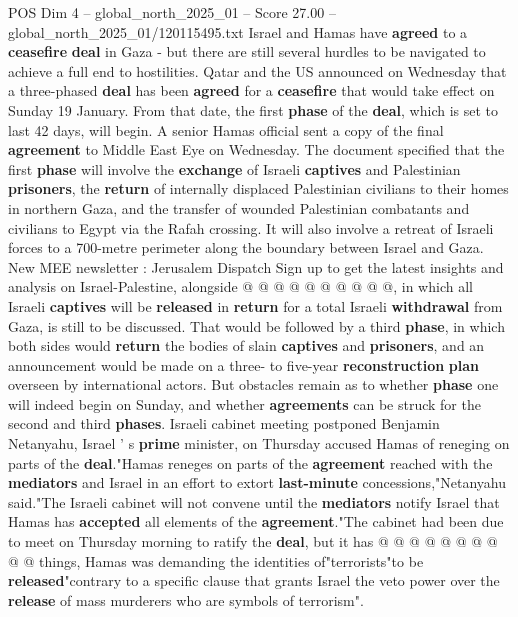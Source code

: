 \begin{textsample}{POS Dim 4 – global\_north\_2025\_01 – Score 27.00 – global\_north\_2025\_01/120115495.txt}  \label{ex:f4_pos_049}
Israel and Hamas have \textbf{agreed} to a \textbf{ceasefire} \textbf{deal} in Gaza - but there are still several hurdles to be navigated to achieve a full end to hostilities.
Qatar and the US announced on Wednesday that a three-phased \textbf{deal} has been \textbf{agreed} for a \textbf{ceasefire} that would take effect on Sunday 19 January.
From that date, the first \textbf{phase} of the \textbf{deal}, which is set to last 42 days, will begin.
A senior Hamas official sent a copy of the final \textbf{agreement} to Middle East Eye on Wednesday.
The document specified that the first \textbf{phase} will involve the \textbf{exchange} of Israeli \textbf{captives} and Palestinian \textbf{prisoners}, the \textbf{return} of internally displaced Palestinian civilians to their homes in northern Gaza, and the transfer of wounded Palestinian combatants and civilians to Egypt via the Rafah crossing.
It will also involve a retreat of Israeli forces to a 700-metre perimeter along the boundary between Israel and Gaza.
New MEE newsletter : Jerusalem Dispatch Sign up to get the latest insights and analysis on Israel-Palestine, alongside @ @ @ @ @ @ @ @ @ @, in which all Israeli \textbf{captives} will be \textbf{released} in \textbf{return} for a total Israeli \textbf{withdrawal} from Gaza, is still to be discussed.
That would be followed by a third \textbf{phase}, in which both sides would \textbf{return} the bodies of slain \textbf{captives} and \textbf{prisoners}, and an announcement would be made on a three- to five-year \textbf{reconstruction} \textbf{plan} overseen by international actors.
But obstacles remain as to whether \textbf{phase} one will indeed begin on Sunday, and whether \textbf{agreements} can be struck for the second and third \textbf{phases}.
Israeli cabinet meeting postponed Benjamin Netanyahu, Israel ' s \textbf{prime} minister, on Thursday accused Hamas of reneging on parts of the \textbf{deal}."Hamas reneges on parts of the \textbf{agreement} reached with the \textbf{mediators} and Israel in an effort to extort \textbf{last-minute} concessions,"Netanyahu said."The Israeli cabinet will not convene until the \textbf{mediators} notify Israel that Hamas has \textbf{accepted} all elements of the \textbf{agreement}."The cabinet had been due to meet on Thursday morning to ratify the \textbf{deal}, but it has @ @ @ @ @ @ @ @ @ @ things, Hamas was demanding the identities of"terrorists"to be \textbf{released}"contrary to a specific clause that grants Israel the veto power over the \textbf{release} of mass murderers who are symbols of terrorism".

\end{textsample}
